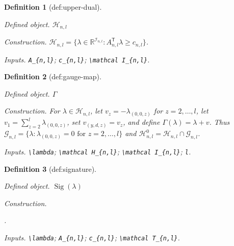 \documentclass{article}
\newtheorem{definition}{Definition}
\begin{document}
\begin{definition}[def:upper-dual]\label{def:upper-dual}
\par\smallskip\noindent\emph{Defined object.} \(\mathcal H_{n,l}\)
\par\smallskip\noindent\emph{Construction.} \(\mathcal H_{n,l}=\{\lambda\in\mathbb R^{\mathcal I_{n,l}}:A_{n,l}^{\mathsf T}\lambda\ge c_{n,l}\}\).
\par\smallskip\noindent\emph{Inputs.} \texttt{A\_\allowbreak{}\{n,\allowbreak{}l\}\allowbreak{}}; \texttt{c\_\allowbreak{}\{n,\allowbreak{}l\}\allowbreak{}}; \texttt{\textbackslash{}\allowbreak{}mathcal I\_\allowbreak{}\{n,\allowbreak{}l\}\allowbreak{}}.
\end{definition}

\begin{definition}[def:gauge-map]\label{def:gauge-map}
\par\smallskip\noindent\emph{Defined object.} \(\Gamma\)
\par\smallskip\noindent\emph{Construction.} For \(\lambda\in\mathcal H_{n,l}\), let \(v_z=-\lambda_{(0,0,z)}\) for \(z=2,\ldots,l\), let \(v_1=\sum_{z=2}^l\lambda_{(0,0,z)}\), set \(v_{(y,d,z)}=v_z\), and define \(\Gamma(\lambda)=\lambda+v\). Thus \(\mathcal G_{n,l}=\{\lambda:\lambda_{(0,0,z)}=0\text{ for }z=2,\ldots,l\}\) and \(\mathcal H^0_{n,l}=\mathcal H_{n,l}\cap\mathcal G_{n,l}\).
\par\smallskip\noindent\emph{Inputs.} \texttt{\textbackslash{}\allowbreak{}lambda}; \texttt{\textbackslash{}\allowbreak{}mathcal H\_\allowbreak{}\{n,\allowbreak{}l\}\allowbreak{}}; \texttt{\textbackslash{}\allowbreak{}mathcal I\_\allowbreak{}\{n,\allowbreak{}l\}\allowbreak{}}; \texttt{l}.
\end{definition}

\begin{definition}[def:signature]\label{def:signature}
\par\smallskip\noindent\emph{Defined object.} \(\operatorname{Sig}(\lambda)\)
\par\smallskip\noindent\emph{Construction.} \par\noindent {}\par\noindent.
\par\smallskip\noindent\emph{Inputs.} \texttt{\textbackslash{}\allowbreak{}lambda}; \texttt{A\_\allowbreak{}\{n,\allowbreak{}l\}\allowbreak{}}; \texttt{c\_\allowbreak{}\{n,\allowbreak{}l\}\allowbreak{}}; \texttt{\textbackslash{}\allowbreak{}mathcal T\_\allowbreak{}\{n,\allowbreak{}l\}\allowbreak{}}.
\end{definition}
\end{document}
